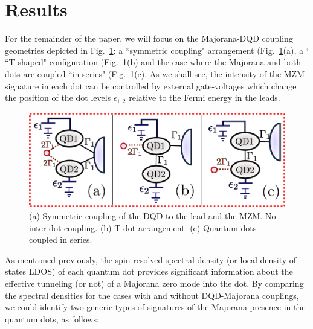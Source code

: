 \documentclass[showpacs,aps,prb,reprint,superscriptaddress]{revtex4-2}
\begin{document}
  


 \section{Results \label{sec:results}}




For the remainder of the paper, we will focus on the Majorana-DQD coupling geometries depicted in Fig.\ \ref{fig:MajoranaModels}: a ``symmetric coupling"  arrangement (Fig.\ \ref{fig:MajoranaModels}(a), a ` ``T-shaped" configuration (Fig.\ \ref{fig:MajoranaModels}(b) and the case where the Majorana and both dots are coupled  ``in-series" (Fig.\ \ref{fig:MajoranaModels}(c). As we shall see, the intensity of the MZM  signature in each dot can be controlled by external gate-voltages which change the position of the dot levels $\epsilon_{1,2}$ relative to the Fermi energy in the leads.





\begin{figure}[t]
    \begin{center}
    \includegraphics[scale=0.5]{Graficos/MajoranaModels.png}
    \caption{\label{fig:MajoranaModels} (a) Symmetric coupling of the DQD to the lead and the MZM. No inter-dot coupling. (b) T-dot arrangement. (c) Quantum dots coupled in series. 
    }
\end{center}
\end{figure}

As mentioned previously, the spin-resolved spectral density (or local density of states LDOS) of each quantum dot provides significant information about the effective tunneling (or not) of a Majorana zero mode into the dot. By comparing the spectral densities for the cases with and without DQD-Majorana couplings, we could identify two generic types of signatures of the Majorana presence in the quantum dots, as follows:
\end{document}
